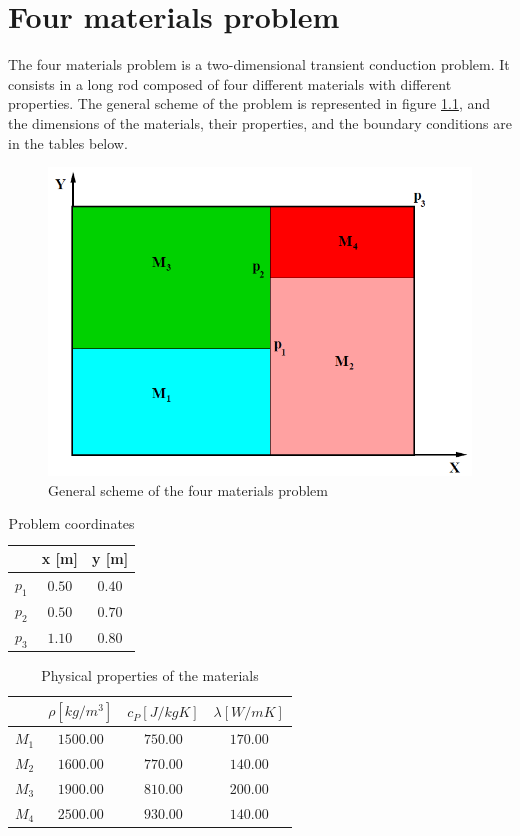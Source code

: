 \chapter{Four materials problem}
The four materials problem is a two-dimensional transient conduction problem. It consists in a long rod composed of four different materials with different properties. The general scheme of the problem is represented in figure \ref{fourmaterials}, and the dimensions of the materials, their properties, and the boundary conditions are in the tables below.
\begin{figure}[H]
	\centering
	\includegraphics[scale = 0.6]{FourMaterials/Fourmaterials}
	\caption{General scheme of the four materials problem}
	\label{fourmaterials}
\end{figure}
\begin{table}[h!]
	\centering
	\begin{tabular}{ |c|c|c|}
		\hline
		  & x [m] & y [m] \\ \hline
		 $p_{1}$ & $0.50$ & $0.40$ \\ \hline
		 $p_{2}$ & $0.50$ & $0.70$ \\ \hline
		 $p_{3}$ & $1.10$ & $0.80$ \\ \hline
	\end{tabular}
\caption{Problem coordinates}
\end{table}
\begin{table}[h!]
	\centering
	\begin{tabular}{ |c|c|c|c| }
		\hline
		& $\rho [kg/m^{3}]$ & $c_{P} [J/kgK]$ & $\lambda [W/mK]$ \\ \hline
		$M_{1}$ & $1500.00$ & $750.00$ & $170.00$ \\ \hline
		$M_{2}$ & $1600.00$ & $770.00$ & $140.00$ \\ \hline
		$M_{3}$ & $1900.00$ & $810.00$ & $200.00$ \\ \hline
		$M_{4}$ & $2500.00$ & $930.00$ & $140.00$ \\ \hline
	\end{tabular}
\caption{Physical properties of the materials}
\end{table}
